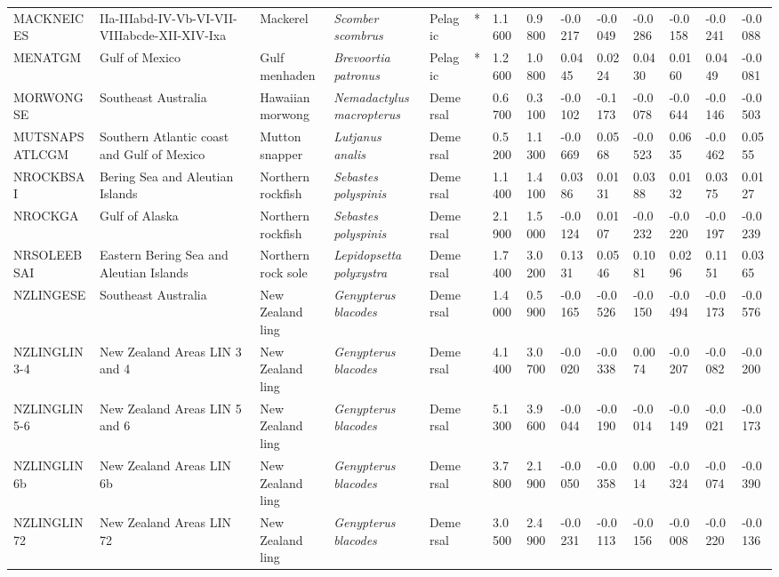 \begin{longtable}{p{2.6cm}p{1.9cm}p{1.7cm}p{1.6cm}p{1cm}p{0.3cm}p{1cm}p{1cm}p{1cm}p{1.1cm}p{1cm}p{1.1cm}p{1cm}p{1.1cm}}
  MACKNEICES & IIa-IIIabd-IV-Vb-VI-VII-VIIIabcde-XII-XIV-Ixa & Mackerel & \textit{Scomber scombrus} & Pelagic & * & 1.1600 & 0.9800 & -0.0217 & -0.0049 & -0.0286 & -0.0158 & -0.0241 & -0.0088 \\ 
  MENATGM & Gulf of Mexico & Gulf menhaden & \textit{Brevoortia patronus} & Pelagic & * & 1.2600 & 1.0800 & 0.0445 & 0.0224 & 0.0430 & 0.0160 & 0.0449 & -0.0081 \\ 
  MORWONGSE & Southeast Australia & Hawaiian morwong & \textit{Nemadactylus macropterus} & Demersal &   & 0.6700 & 0.3100 & -0.0102 & -0.1173 & -0.0078 & -0.0644 & -0.0146 & -0.0503 \\ 
  MUTSNAPSATLCGM & Southern Atlantic coast and Gulf of Mexico & Mutton snapper & \textit{Lutjanus analis} & Demersal &   & 0.5200 & 1.1300 & -0.0669 & 0.0568 & -0.0523 & 0.0635 & -0.0462 & 0.0555 \\ 
  NROCKBSAI & Bering Sea and Aleutian Islands & Northern rockfish & \textit{Sebastes polyspinis} & Demersal &   & 1.1400 & 1.4100 & 0.0386 & 0.0131 & 0.0388 & 0.0132 & 0.0375 & 0.0127 \\ 
  NROCKGA & Gulf of Alaska & Northern rockfish & \textit{Sebastes polyspinis} & Demersal &   & 2.1900 & 1.5000 & -0.0124 & 0.0107 & -0.0232 & -0.0220 & -0.0197 & -0.0239 \\ 
  NRSOLEEBSAI & Eastern Bering Sea and Aleutian Islands & Northern rock sole & \textit{Lepidopsetta polyxystra} & Demersal &   & 1.7400 & 3.0200 & 0.1331 & 0.0546 & 0.1081 & 0.0296 & 0.1151 & 0.0365 \\ 
  NZLINGESE & Southeast Australia & New Zealand ling & \textit{Genypterus blacodes} & Demersal &   & 1.4000 & 0.5900 & -0.0165 & -0.0526 & -0.0150 & -0.0494 & -0.0173 & -0.0576 \\ 
  NZLINGLIN3-4 & New Zealand Areas LIN 3 and 4 & New Zealand ling & \textit{Genypterus blacodes} & Demersal &   & 4.1400 & 3.0700 & -0.0020 & -0.0338 & 0.0074 & -0.0207 & -0.0082 & -0.0200 \\ 
  NZLINGLIN5-6 & New Zealand Areas LIN 5 and 6 & New Zealand ling & \textit{Genypterus blacodes} & Demersal &   & 5.1300 & 3.9600 & -0.0044 & -0.0190 & -0.0014 & -0.0149 & -0.0021 & -0.0173 \\ 
  NZLINGLIN6b & New Zealand Areas LIN 6b & New Zealand ling & \textit{Genypterus blacodes} & Demersal &   & 3.7800 & 2.1900 & -0.0050 & -0.0358 & 0.0014 & -0.0324 & -0.0074 & -0.0390 \\ 
  NZLINGLIN72 & New Zealand Areas LIN 72 & New Zealand ling & \textit{Genypterus blacodes} & Demersal &   & 3.0500 & 2.4900 & -0.0231 & -0.0113 & -0.0156 & -0.0008 & -0.0220 & -0.0136 \\ 

\end{longtable}
